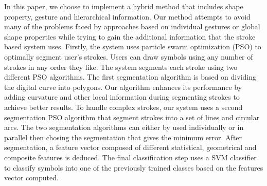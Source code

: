 \documentclass[preprint,10pt,5p,twocolumn]{elsarticle}
\begin{document}
In this paper, we choose to implement a hybrid method that includes shape property, gesture and hierarchical information. Our method attempts to avoid many of the problems faced by approaches based on individual gestures or global shape properties while trying to gain the additional information that the stroke based system uses. Firstly, the system uses particle swarm optimization (PSO) to optimally segment user's strokes. Users can draw symbols using any number of strokes in any order they like. The system segments each stroke using two different PSO algorithms. The first segmentation algorithm is based on dividing the digital curve into polygons\cite{PolygonApproximationPSO}. Our algorithm enhances its performance by adding curvature and other local information during segmenting strokes to achieve better results. To handle complex strokes, our system uses a second segmentation PSO algorithm that segment strokes into a set of lines and circular arcs. The two segmentation algorithms can either by used  individually or in parallel then chosing the segmentation that gives the minimum error. After segmentation, a feature vector composed of different statistical, geometrical and composite features is deduced. The final classification step uses a SVM classifier to classify symbols into one of the previously trained classes based on the features vector computed.



  
\end{document}
